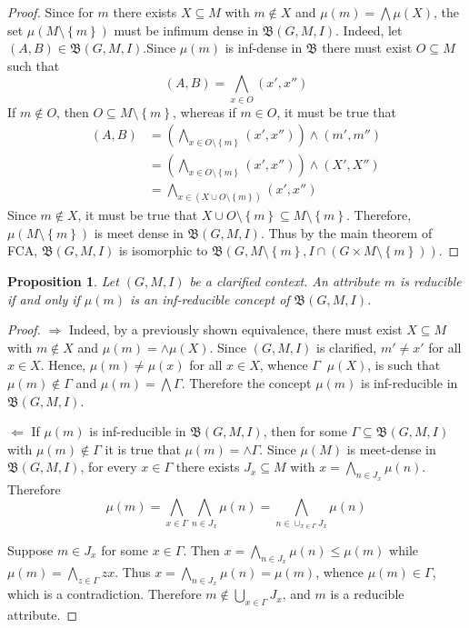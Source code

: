 \documentclass[a4paper]{article}
\newcommand{\obj}[1]{{\left\{ #1 \right \}}}
\newcommand{\brac}[1]{{\left ( #1 \right )}}
\newcommand{\cltc}{\mathfrak{B}}
\newtheorem{prop}{Proposition}
\newcommand{\defn}{\mathop{\overset{\Delta}{=}}\nolimits}
\begin{document}
\begin{proof}
Since for $m$ there exists $X\subseteq M$ with $m\notin X$ and $\mu(m) = \bigwedge \mu(X)$, the set $\mu\brac{M\setminus\obj{m}}$ must be infimum dense in $\cltc(G,M,I)$. Indeed, let $(A,B)\in \cltc(G,M,I)$.Since $\mu(m)$ is inf-dense in $\cltc$ there must exist $O\subseteq M$ such that \[(A,B) = \bigwedge_{x\in O} (x', x'')\] If $m\notin O$, then $O\subseteq M\setminus \obj{m}$, whereas if $m\in O$, it must be true that
\begin{align*}
(A,B) &= \brac{\bigwedge_{x\in O\setminus \obj{m}} (x', x'')} \wedge (m', m'') \\ &= \brac{\bigwedge_{x\in O\setminus \obj{m}} (x', x'')} \wedge (X', X'') \\ &= \bigwedge_{x\in \brac{X\cup O\setminus \obj{m}}} (x', x'')
\end{align*}
Since $m\notin X$, it must be true that $X\cup O\setminus \obj{m}\subseteq M\setminus \obj{m}$. Therefore, $\mu\brac{M\setminus\obj{m}}$ is meet dense in $\cltc(G,M,I)$. Thus by the main theorem of FCA, $\cltc(G,M,I)$ is isomorphic to $\cltc\brac{G,M\setminus \obj{m},I\cap ( G\times M\setminus \obj{m})}$.
\end{proof}

\begin{prop} Let $(G,M,I)$ be a clarified context. An attribute $m$ is reducible if and only if $\mu(m)$ is an inf-reducible concept of $\cltc(G,M,I)$.
\end{prop}

\begin{proof}
$\Rightarrow$ Indeed, by a previously shown equivalence, there must exist $X\subseteq M$ with $m\notin X$ and $\mu(m) = \wedge \mu(X)$. Since $(G,M,I)$ is clarified, $m'\neq x'$ for all $x\in X$. Hence, $\mu(m)\neq \mu(x)$ for all $x\in X$, whence $\Gamma \defn \mu(X)$, is such that $\mu(m)\notin \Gamma$ and $\mu(m)=\bigwedge \Gamma$. Therefore the concept $\mu(m)$ is inf-reducible in $\cltc(G,M,I)$.

$\Leftarrow$ If $\mu(m)$ is inf-reducible in $\cltc(G,M,I)$, then for some $\Gamma\subseteq \cltc(G,M,I)$ with $\mu(m)\notin \Gamma$ it is true that $\mu(m)=\wedge \Gamma$. Since $\mu(M)$ is meet-dense in $\cltc(G,M,I)$, for every $x\in \Gamma$ there exists $J_x\subseteq M$ with $x = \bigwedge_{n\in J_x} \mu(n)$. Therefore \[\mu(m) = \bigwedge_{x\in \Gamma} \bigwedge_{n\in J_x} \mu(n) = \bigwedge_{n\in \cup_{x\in \Gamma} J_x} \mu(n)\]

Suppose $m\in J_x$ for some $x\in \Gamma$. Then $ x = \bigwedge_{n\in J_x} \mu(n) \leq \mu(m)$ while $\mu(m) = \bigwedge_{z\in \Gamma} z x$. Thus $x = \bigwedge_{n\in J_x} \mu(n) = \mu(m)$, whence $\mu(m)\in \Gamma$, which is a contradiction. Therefore $m\notin \bigcup_{x\in \Gamma} J_x$, and $m$ is a reducible attribute.
\end{proof}
\end{document}
